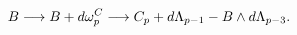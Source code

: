 \begin{equation}
B\longrightarrow B+d\omega\sp
C_p\longrightarrow C_p+d\Lambda_{p-1}-B\wedge d\Lambda_{p-3}.
\end{equation} 
